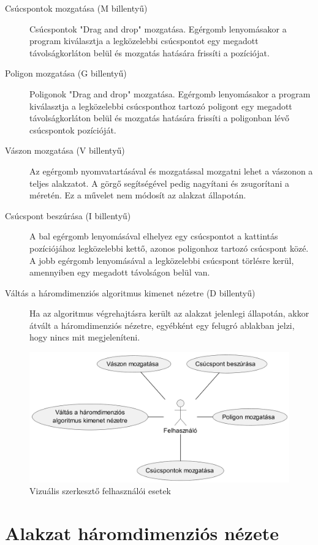 \begin{description}
    \item[Csúcspontok mozgatása (M billentyű)] Csúcspontok "Drag and drop" mozgatása. Egérgomb lenyomásakor a program kiválasztja a legközelebbi csúcspontot egy megadott távolságkorláton belül és mozgatás hatására frissíti a pozíciójat.
    \item[Poligon mozgatása (G billentyű)]  Poligonok "Drag and drop" mozgatása. Egérgomb lenyomásakor a program kiválasztja a legközelebbi csúcsponthoz tartozó poligont egy megadott távolságkorláton belül és mozgatás hatására frissíti a poligonban lévő csúcspontok pozícióját.
    \item[Vászon mozgatása (V billentyű)] Az egérgomb nyomvatartásával és mozgatással mozgatni lehet a vászonon a teljes alakzatot. A görgő segítségével pedig nagyítani és zsugorítani a méretén. Ez a művelet nem módosít az alakzat állapotán.
    \item[Csúcspont beszúrása (I billentyű)] A bal egérgomb lenyomásával elhelyez egy csúcspontot a kattintás pozíciójához legközelebbi kettő, azonos poligonhoz tartozó csúcspont közé. A jobb egérgomb lenyomásával a legközelebbi csúcspont törlésre kerül, amennyiben egy megadott távolságon belül van.
    \item[Váltás a háromdimenziós algoritmus kimenet nézetre (D billentyű)] Ha az algoritmus végrehajtásra került az alakzat jelenlegi állapotán, akkor átvált a háromdimenziós nézetre, egyébként egy felugró ablakban jelzi, hogy nincs mit megjeleníteni.
\end{description}

\begin{figure}[H]
    \centering
    \includegraphics[width=.7\linewidth]{images/usecase_visual_editor.png}
    \caption{Vizuális szerkesztő felhasználói esetek}
    \label{fig:usecase_visual_editor-1}
\end{figure}

\section{Alakzat háromdimenziós nézete}

